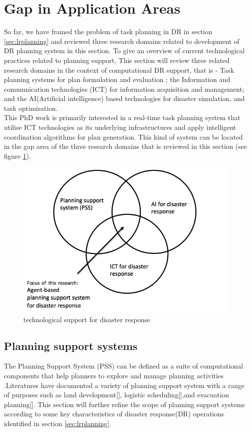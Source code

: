 \section{Gap in Application Areas}
So far, we have framed the problem of task planning in DR in section \ref{sec:lrplanning} and reviewed three research domains related to development of DR planning system in this section. To give an overview of current technological practices related to planning support, This section will review three related research domains in the context of computational DR support, that is - Task planning systems for plan formulation and evaluation ; the Information and communication technologies (ICT) for information acquisition and management; and the AI(Artificial intelligence) based technologies for disaster simulation, and task optimisation.  \\

This PhD work is primarily interested in a real-time task planning system that utilise ICT technologies as its underlying infrastructures and apply intelligent coordination algorithms for plan generation. This kind of system can be located in the gap area of the three research domains that is reviewed in this section (see figure \ref{fig:SystemFraming}).\\

\begin{figure}[h]
  \centering
  \includegraphics[width=1\textwidth]{img/background/SystemFraming}
  \caption{technological support for disaster response}
  \label{fig:SystemFraming}
\end{figure} 

\subsection{Planning support systems}
The Planning Support System (PSS) can be defined as a suite of computational components that help planners to explore and manage planning activities \cite{Geertman2004}.Literatures have documented a variety of planning support system with a range of purposes such as land development[], logistic scheduling[],and evacuation planning[]. This section will further refine the scope of planning support systems according to some key characteristics of disaster response(DR) operations identified in section \ref{sec:lrplanning}.\\

